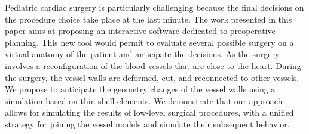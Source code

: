 Pediatric cardiac surgery is particularly challenging because the final decisions on the procedure choice take place at the last minute.
The work presented in this paper aims at proposing an interactive software dedicated to preoperative planning.
This new tool would permit to evaluate several possible surgery on a virtual anatomy of the patient and anticipate the decisions.
As the surgery involves a reconfiguration of the blood vessels that are close to the heart.
During the surgery, the vessel walls are deformed, cut, and reconnected to other vessels.
We propose to anticipate the geometry changes of the vessel walls using a simulation based on thin-shell elements.
We demonstrate that our approach allows for simulating the results of low-level surgical procedures, with a unified strategy for joining the vessel models and simulate their subsequent behavior.

